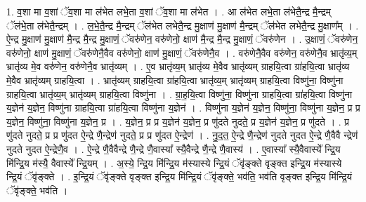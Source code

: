 \documentclass[17pt]{extarticle}
\begin{document}
1. व॒शा मा व॒शां ॅव॒शा मा ल॑भेत लभे॒ता व॒शां ॅव॒शा मा ल॑भेत । . आ ल॑भेत लभे॒ता ल॑भेतै॒न्द्र मै॒न्द्रम् ॅल॑भे॒ता ल॑भेतै॒न्द्रम् । . ल॒भे॒तै॒न्द्र मै॒न्द्रम् ॅल॑भेत लभेतै॒न्द्र मु॒क्षाण॑ मु॒क्षाण॑ मै॒न्द्रम् ॅल॑भेत लभेतै॒न्द्र मु॒क्षाण᳚म् । . ऐ॒न्द्र मु॒क्षाण॑ मु॒क्षाण॑ मै॒न्द्र मै॒न्द्र मु॒क्षाणं॒ ॅवरु॑णेन॒ वरु॑णेनो॒ क्षाण॑ मै॒न्द्र मै॒न्द्र मु॒क्षाणं॒ ॅवरु॑णेन । . उ॒क्षाणं॒ ॅवरु॑णेन॒ वरु॑णेनो॒ क्षाण॑ मु॒क्षाणं॒ ॅवरु॑णेनै॒वैव वरु॑णेनो॒ क्षाण॑ मु॒क्षाणं॒ ॅवरु॑णेनै॒व । . वरु॑णेनै॒वैव वरु॑णेन॒ वरु॑णेनै॒व भ्रातृ॑व्य॒म् भ्रातृ॑व्य मे॒व वरु॑णेन॒ वरु॑णेनै॒व भ्रातृ॑व्यम् । . ए॒व भ्रातृ॑व्य॒म् भ्रातृ॑व्य मे॒वैव भ्रातृ॑व्यम् ग्राहयि॒त्वा ग्रा॑हयि॒त्वा भ्रातृ॑व्य मे॒वैव भ्रातृ॑व्यम् ग्राहयि॒त्वा । . भ्रातृ॑व्यम् ग्राहयि॒त्वा ग्रा॑हयि॒त्वा भ्रातृ॑व्य॒म् भ्रातृ॑व्यम् ग्राहयि॒त्वा विष्णु॑ना॒ विष्णु॑ना ग्राहयि॒त्वा भ्रातृ॑व्य॒म् भ्रातृ॑व्यम् ग्राहयि॒त्वा विष्णु॑ना । . ग्रा॒ह॒यि॒त्वा विष्णु॑ना॒ विष्णु॑ना ग्राहयि॒त्वा ग्रा॑हयि॒त्वा विष्णु॑ना य॒ज्ञेन॑ य॒ज्ञेन॒ विष्णु॑ना ग्राहयि॒त्वा ग्रा॑हयि॒त्वा विष्णु॑ना य॒ज्ञेन॑ । . विष्णु॑ना य॒ज्ञेन॑ य॒ज्ञेन॒ विष्णु॑ना॒ विष्णु॑ना य॒ज्ञेन॒ प्र प्र य॒ज्ञेन॒ विष्णु॑ना॒ विष्णु॑ना य॒ज्ञेन॒ प्र । . य॒ज्ञेन॒ प्र प्र य॒ज्ञेन॑ य॒ज्ञेन॒ प्र णु॑दते नुदते॒ प्र य॒ज्ञेन॑ य॒ज्ञेन॒ प्र णु॑दते । . प्र णु॑दते नुदते॒ प्र प्र णु॑दत ऐ॒न्द्रे णै॒न्द्रेण॑ नुदते॒ प्र प्र णु॑दत ऐ॒न्द्रेण॑ । . नु॒द॒त॒ ऐ॒न्द्रे णै॒न्द्रेण॑ नुदते नुदत ऐ॒न्द्रे णै॒वैवै न्द्रेण॑ नुदते नुदत ऐ॒न्द्रेणै॒व । . ऐ॒न्द्रे णै॒वैवैन्द्रे णै॒न्द्रे णै॒वास्या᳚ स्यै॒वैन्द्रे णै॒न्द्रे णै॒वास्य॑ । . ए॒वास्या᳚ स्यै॒वैवास्ये᳚ न्द्रि॒य मि॑न्द्रि॒य म॑स्यै॒ वैवास्ये᳚ न्द्रि॒यम् । . अ॒स्ये॒ न्द्रि॒य मि॑न्द्रि॒य म॑स्यास्ये न्द्रि॒यं ॅवृ॑ङ्क्ते वृङ्क्त इन्द्रि॒य म॑स्यास्ये न्द्रि॒यं ॅवृ॑ङ्क्ते । . इ॒न्द्रि॒यं ॅवृ॑ङ्क्ते वृङ्क्त इन्द्रि॒य मि॑न्द्रि॒यं ॅवृ॑ङ्क्ते॒ भव॑ति॒ भव॑ति वृङ्क्त इन्द्रि॒य मि॑न्द्रि॒यं ॅवृ॑ङ्क्ते॒ भव॑ति । \newline
\end{document}
